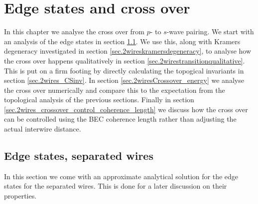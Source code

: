 
\chapter{Edge states and cross over} %

\label{Chapter10} %


In this chapter we analyse the cross over from $p$- to $s$-wave pairing. We start with an analysis of the edge states in section \ref{sec.2wiresedgestatesedgestates}. We use this, along with Kramers degeneracy investigated in section \ref{sec.2wireskramersdegeneracy}, to analyse how the cross over happens qualitatively in section \ref{sec.2wirestransitionqualitative}. This is put on a firm footing by directly calculating the topogical invariants in section \ref{sec.2wires_CSinv}. In section \ref{sec.2wiresCrossover_energy} we analyse the cross over numerically and compare this to the expectation from the topological analysis of the previous sections. Finally in section \ref{sec.2wires_crossover_control_coherence_length} we discuss how the cross over can be controlled using the BEC coherence length rather than adjusting the actual interwire distance. 

\section{Edge states, separated wires}
\label{sec.2wiresedgestatesedgestates}
In this section we come with an approximate analytical solution for the edge states for the separated wires. This is done for a later discussion on their properties.


